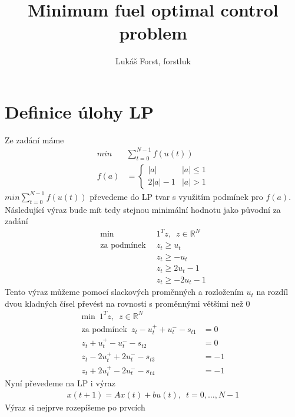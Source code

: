 \documentclass[12pt]{article}
\begin{document}
    \title{Minimum fuel optimal control problem}
    \author{Lukáš Forst, forstluk}
    \maketitle

    \section{Definice úlohy LP}\label{sec:definice-úlohy-lp}
    Ze zadání máme
    \begin{align*}
        min & \sum_{t=0}^{N-1}f(u(t))\\
        f(a) &= \left
        \{ \begin{array}{ll}
               |a| & |a|\leq 1\\
               2|a|-1 & |a| >1
        \end{array} \right.
    \end{align*}
    $min \sum_{t=0}^{N-1}f(u(t))$  převedeme do LP tvar s využitím podmínek pro $f(a)$.\\
    Následující výraz bude mít tedy stejnou minimální hodnotu jako původní za zadání
    \begin{align*}
        \text{min} \enspace & 1^T z,\enspace z \in \mathbb{R}^N\\
        \text{za podmínek} \enspace & z_t \geq u_t\\
        &z_t  \geq -u_t\\
        &z_t  \geq 2u_t-1\\
        &z_t  \geq -2u_t-1
    \end{align*}
    Tento výraz můžeme pomocí slackových proměnných a rozložením \(u_t\) na rozdíl dvou kladných čísel převést na
    rovnosti s proměnnými většími než 0
    \begin{align*}
        \text{min} \enspace 1^T z,\enspace z \in \mathbb{R}^N\\
        \text{za podmínek} \enspace z_t - u_t^+ + u_t^- - s_{t1} &= 0\\
        z_t + u_t^+ - u_t^- - s_{t2} &= 0\\
        z_t - 2u_t^+ + 2u_t^- - s_{t3} &= -1\\
        z_t + 2u_t^+ - 2u_t^- - s_{t4} &= -1
    \end{align*}
    Nyní převedeme na LP i výraz
    \begin{align*}
        x(t+1) = Ax(t) +bu(t), \enspace t = 0,\ldots,N-1
    \end{align*}
    Výraz si nejprve rozepíšeme po prvcích
\end{document}
